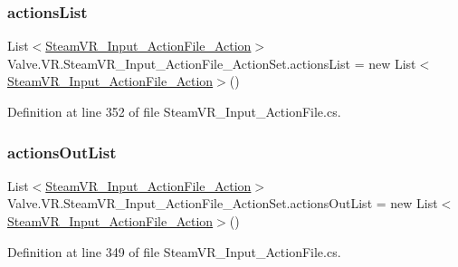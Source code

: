 \subsubsection{\texorpdfstring{actionsList}{actionsList}}
{\footnotesize\ttfamily List$<$\mbox{\hyperlink{class_valve_1_1_v_r_1_1_steam_v_r___input___action_file___action}{Steam\+V\+R\+\_\+\+Input\+\_\+\+Action\+File\+\_\+\+Action}}$>$ Valve.\+V\+R.\+Steam\+V\+R\+\_\+\+Input\+\_\+\+Action\+File\+\_\+\+Action\+Set.\+actions\+List = new List$<$\mbox{\hyperlink{class_valve_1_1_v_r_1_1_steam_v_r___input___action_file___action}{Steam\+V\+R\+\_\+\+Input\+\_\+\+Action\+File\+\_\+\+Action}}$>$()}



Definition at line 352 of file Steam\+V\+R\+\_\+\+Input\+\_\+\+Action\+File.\+cs.

\mbox{\label{class_valve_1_1_v_r_1_1_steam_v_r___input___action_file___action_set_ad75502966a89e0263e38313ac6021224}} 
\subsubsection{\texorpdfstring{actionsOutList}{actionsOutList}}
{\footnotesize\ttfamily List$<$\mbox{\hyperlink{class_valve_1_1_v_r_1_1_steam_v_r___input___action_file___action}{Steam\+V\+R\+\_\+\+Input\+\_\+\+Action\+File\+\_\+\+Action}}$>$ Valve.\+V\+R.\+Steam\+V\+R\+\_\+\+Input\+\_\+\+Action\+File\+\_\+\+Action\+Set.\+actions\+Out\+List = new List$<$\mbox{\hyperlink{class_valve_1_1_v_r_1_1_steam_v_r___input___action_file___action}{Steam\+V\+R\+\_\+\+Input\+\_\+\+Action\+File\+\_\+\+Action}}$>$()}



Definition at line 349 of file Steam\+V\+R\+\_\+\+Input\+\_\+\+Action\+File.\+cs.

\mbox{\label{class_valve_1_1_v_r_1_1_steam_v_r___input___action_file___action_set_ae074781c069d0f0b46dfd815857dbd9c}} 
